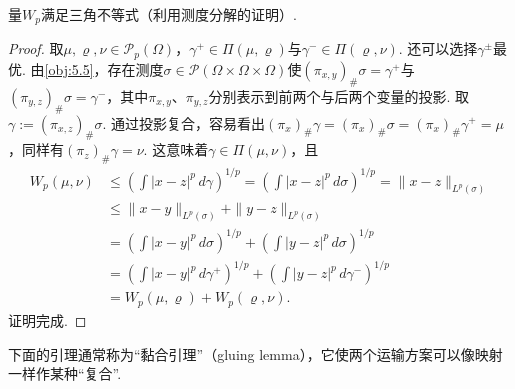 \begin{lemma}\label{obj:5.4}
量$W_p$满足三角不等式（利用测度分解的证明）.
\end{lemma}
\begin{proof}
取$\mu,\varrho,\nu\in\mathscr P_p(\Omega)$，$\gamma^+\in\Pi(\mu,\varrho)$与$\gamma^-\in\Pi(\varrho,\nu)$. 还可以选择$\gamma^\pm$最优. 由\autoref{obj:5.5}，存在测度$\sigma\in\mathscr P(\Omega\times\Omega\times\Omega)$使$(\pi_{x,y})_\#\sigma=\gamma^+$与$(\pi_{y,z})_\#\sigma=\gamma^-$，其中$\pi_{x,y}$、$\pi_{y,z}$分别表示到前两个与后两个变量的投影. 取$\gamma:=(\pi_{x,z})_\#\sigma$. 通过投影复合，容易看出$(\pi_x)_\#\gamma=(\pi_x)_\#\sigma=(\pi_x)_\#\gamma^+=\mu$，同样有$(\pi_z)_\#\gamma=\nu$. 这意味着$\gamma\in\Pi(\mu,\nu)$，且
\[
\begin{aligned}
W_p(\mu,\nu)&\le\left(\int|x-z|^p\,d\gamma\right)^{1/p}
=\left(\int|x-z|^p\,d\sigma\right)^{1/p}=\|x-z\|_{L^p(\sigma)}\\
&\le\|x-y\|_{L^p(\sigma)}+\|y-z\|_{L^p(\sigma)}\\
&=\left(\int|x-y|^p\,d\sigma\right)^{1/p}+\left(\int|y-z|^p\,d\sigma\right)^{1/p}\\
&=\left(\int|x-y|^p\,d\gamma^+\right)^{1/p}+\left(\int|y-z|^p\,d\gamma^-\right)^{1/p}\\
&=W_p(\mu,\varrho)+W_p(\varrho,\nu).
\end{aligned}
\]
证明完成.
\end{proof}

下面的引理通常称为“黏合引理”（gluing lemma），它使两个运输方案可以像映射一样作某种“复合”.

